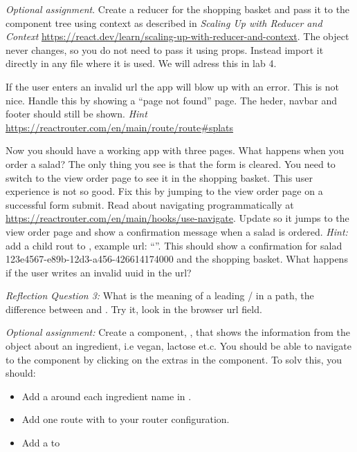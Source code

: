 \documentclass[fleqn, article, a4paper]{memoir}
\begin{document}
\begin{Assignments}
\item \label{opt:redux} \emph{Optional assignment}. Create a reducer for the shopping basket and pass it to the component tree using context as described in \emph{Scaling Up with Reducer and Context} \url{https://react.dev/learn/scaling-up-with-reducer-and-context}. The  object never changes, so you do not need to pass it using props. Instead import it directly in any file where it is used. We will adress this in lab 4.

\item If the user enters an invalid url the app will blow up with an error. This is not nice. Handle this by showing a ``page not found'' page. The heder, navbar and footer should still be shown. \emph{Hint} \url{https://reactrouter.com/en/main/route/route#splats}

\item Now you should have a working app with three pages. What happens when you order a salad? The only thing you see is that the form is cleared. You need to switch to the view order page to see it in the shopping basket. This user experience is not so good. Fix this by jumping to the view order page on a successful form submit. Read about navigating programmatically at \url{https://reactrouter.com/en/main/hooks/use-navigate}. Update  so it jumps to the view order page and show a confirmation message when a salad is ordered. \emph{Hint:} add a child rout to , example url: ``''. This should show a confirmation for salad 123e4567-e89b-12d3-a456-426614174000 and the shopping basket. What happens if the user writes an invalid uuid in the url?

\noindent \emph{Reflection Question 3:} What is the meaning of a leading / in a path, the difference between  and . Try it, look in the browser url field.

\item \emph{Optional assignment:} Create a component, , that shows the information from the  object about an ingredient, i.e vegan, lactose et.c. You should be able to navigate to the  component by clicking on the extras in the  component. To solv this, you should:

\begin{itemize}
  \item Add a  around each ingredient name in .
  \item Add one route with  to your router configuration.
  \item Add a  to 
\end{itemize}


\end{Assignments}
\end{document}
